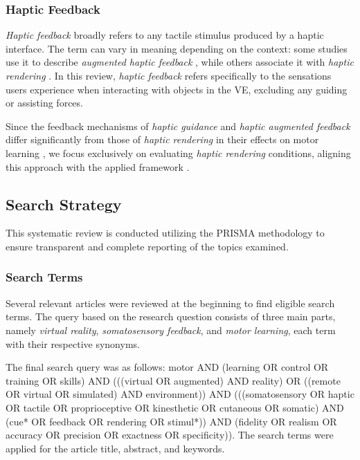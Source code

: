 \subsubsection{Haptic Feedback}
\textit{Haptic feedback} broadly refers to any tactile stimulus produced by a haptic interface. The term can vary in meaning depending on the context: some studies use it to describe \textit{augmented haptic feedback} \cite{Gambaro2014}, while others associate it with \textit{haptic rendering} \cite{Caccianiga2021}. In this review, \textit{haptic feedback} refers specifically to the sensations users experience when interacting with objects in the VE, excluding any guiding or assisting forces.\newline

Since the feedback mechanisms of \textit{haptic guidance} and \textit{haptic augmented feedback} differ significantly from those of \textit{haptic rendering} in their effects on motor learning \cite{Sigrist2013AugmentedReview}, we focus exclusively on evaluating \textit{haptic rendering} conditions, aligning this approach with the applied framework \cite{Muender2022HapticReality}. 

\subsection{Search Strategy}

This systematic review is conducted utilizing the PRISMA methodology \cite{Page2021TheReviews} to ensure transparent and complete reporting of the topics examined.

\subsubsection{Search Terms}
Several relevant articles were reviewed at the beginning to find eligible search terms. The query based on the research question consists of three main parts, namely \textit{virtual reality}, \textit{somatosensory feedback}, and \textit{motor learning}, each term with their respective synonyms. 

The final search query was as follows: motor AND (learning OR control OR training OR skills) AND (((virtual OR augmented) AND reality) OR ((remote OR virtual OR simulated) AND environment)) AND (((somatosensory OR haptic OR tactile OR proprioceptive OR kinesthetic OR cutaneous OR somatic) AND 
(cue* OR feedback OR rendering OR stimul*)) AND (fidelity OR realism OR accuracy OR precision OR exactness OR specificity)). The search terms were applied for the article title, abstract, and keywords.


